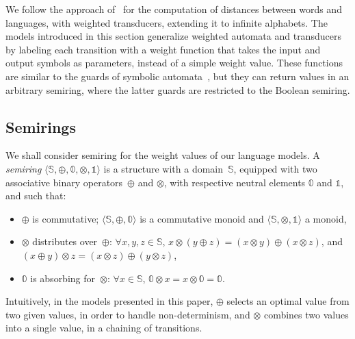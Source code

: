 \documentclass[runningheads]{llncs}
\def\<#1>{\langle #1 \rangle}
\newcommand{\Semiring}{\mathbb{S}}
\newcommand{\zero}{\mathbb{0}}
\newcommand{\one}{\mathbb{1}}
\begin{document}
We follow the approach of~\cite{Mohri03EDWA} for the computation of distances
between words and languages, with weighted transducers, 
extending it to infinite alphabets.
%
The models introduced in this section generalize 
weighted automata and transducers~\cite{Droste09handbook} 
by labeling each transition with a weight function that takes the 
input and output symbols as parameters, instead of a simple weight value.
These functions are similar to the guards of symbolic automata~\cite{dAntoniVeanes17CAV,dAntoni21CACM},
but they can return values in an arbitrary semiring, 
where the latter guards are restricted to the Boolean semiring.


\subsection{Semirings}
\label{section:semiring}
We shall consider semiring for the weight values of our language models.
%
A \emph{semiring} $\< \Semiring, \oplus, \zero, \otimes, \one>$ 
is a structure with a domain~$\Semiring$,
equipped with two associative
binary operators~$\oplus$ and $\otimes$,
with respective neutral elements $\zero$ and $\one$, and such that:
\begin{itemize}
\item $\oplus$ is commutative;
 $\< \Semiring, \oplus, \zero>$ is a commutative monoid 
   and $\< \Semiring, \otimes, \one>$ a monoid,
\item $\otimes$ distributes over~$\oplus$:  $\forall x, y, z \in \mathbb{S}$,
$x \otimes (y \oplus z) = (x \otimes y) \oplus (x \otimes z)$, 
and $(x \oplus y) \otimes z = (x \otimes z) \oplus (y \otimes z)$,
\item $\zero$ is absorbing for~$\otimes$: 
$\forall x\in \mathbb{S}$, $\zero \otimes x = x \otimes \zero = \zero$.
\end{itemize}
%
Intuitively, in the models presented in this paper, 
$\oplus$ selects an optimal value from two given values, 
in order to handle non-determinism, 
and $\otimes$ combines two values into a single value, 
in a chaining of transitions.
\end{document}
